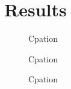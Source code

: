 \documentclass[main.tex]{subfiles}
\begin{document}
\section{Results}
	\begin{figure}[H]
		\begin{center}
			
		\end{center}
		\caption{Cpation}
		\label{fig:blarg}
	\end{figure}
	\begin{figure}[H]
		\begin{center}
			
		\end{center}
		\caption{Cpation}
		\label{fig:blarg}
	\end{figure}
	\begin{figure}[H]
		\begin{center}
			
		\end{center}
		\caption{Cpation}
		\label{fig:blarg}
	\end{figure}
\end{document}
